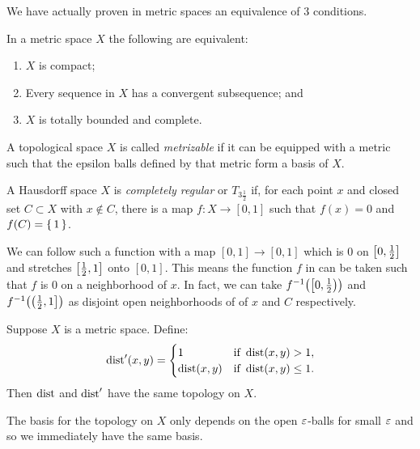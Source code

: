 \documentclass[letterpaper, 11pt, oneside]{book}
\begin{document}
We have actually proven in metric spaces an equivalence of 3 conditions.

\begin{cor}
  In a metric space $X$ the following are equivalent:
  \begin{enumerate}
  \item $X$ is compact;
  \item Every sequence in $X$ has a convergent subsequence; and
  \item $X$ is totally bounded and complete.
  \end{enumerate}
\end{cor}

\begin{defn}[Metrizable]
  A topological space $X$ is called \emph{metrizable} if it can be equipped with a metric such that the epsilon balls defined by that metric form a basis of $X$.
\end{defn}

\clearpage

\begin{defn}\label{defn: completely_regular}
  A Hausdorff space $X$ is \emph{completely regular} or $T_{3 \frac{1}{2}}$ if, for each point $x$ and closed set $C \subset X$ with $x \notin C$, there is a map $f\colon X \to [0, 1]$ such that $f(x) = 0$ and $f(C) = \set{1}$.
\end{defn}

We can follow such a function with a map $[0, 1] \to [0, 1]$ which is $0$ on $\bqty{0, \frac{1}{2}}$ and stretches $\bqty{\frac{1}{2}, 1}$ onto $[0, 1]$.
This means the function $f$ in  can be taken such that $f$ is $0$ on a neighborhood of $x$.
In fact, we can take $f^{-1}\pqty{\left[ 0, \frac{1}{2} \right)}$ and $f^{-1}\pqty{\left( \frac{1}{2}, 1 \right]}$ as disjoint open neighborhoods of of $x$ and $C$ respectively.

\begin{prop}\label{prop: bounded_metric_leq_1}
  Suppose $X$ is a metric space. Define:
  \[
  \operatorname{dist}'(x, y) = \begin{cases}
                   1           & \text{if } \operatorname{dist}(x, y) > 1, \\
                   \operatorname{dist}(x, y) & \text{if } \operatorname{dist}(x, y) \leq 1.
                 \end{cases}
  \]
  Then $\operatorname{dist}$ and $\operatorname{dist}'$ have the same topology on $X$.
\end{prop}
\begin{pf}
  The basis for the topology on $X$ only depends on the open $\varepsilon$-balls for small $\varepsilon$ and so we immediately have the same basis.
\end{pf}
\end{document}
